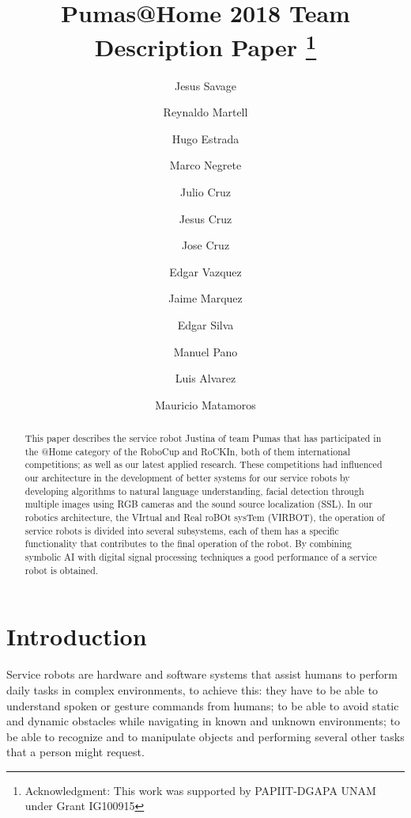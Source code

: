 \documentclass{llncs}
\begin{document}
\title{Pumas@Home 2018 Team Description Paper
\thanks{Acknowledgment: This work was supported by PAPIIT-DGAPA UNAM under Grant IG100915}}
\author{
	Jesus Savage 
	\and Reynaldo Martell 
	\and Hugo Estrada 
	\and Marco Negrete 
	\and Julio Cruz 
	\and Jesus Cruz
	\and Jose Cruz
	\and Edgar Vazquez
	\and Jaime Marquez
	\and Edgar Silva
	\and Manuel Pano 
	\and Luis Alvarez
	\and Mauricio Matamoros
}
\maketitle


\begin{abstract}

This paper describes the service robot Justina of team Pumas that has participated in the @Home category of the RoboCup and RoCKIn, both of them international competitions; as well as our latest applied research. These competitions had influenced our architecture in the development of better systems for our service robots by developing algorithms to natural language understanding, facial detection through multiple images using RGB cameras and the sound source localization (SSL). 
In our robotics architecture, the VIrtual and Real roBOt sysTem (VIRBOT), the operation of service robots is divided into several subsystems, each of them has a specific functionality  that contributes to the final operation of the robot.
By combining symbolic AI with digital signal processing techniques a good performance of a service robot is obtained.

\end{abstract}


\section{Introduction}

Service robots are hardware and software systems that assist humans to perform daily tasks in complex environments, to achieve this: they have to be able to understand spoken or gesture commands from humans; to be able to avoid static and dynamic obstacles while navigating in known and unknown environments; to be able to recognize and to manipulate objects and performing several other tasks that a person might request. 
\end{document}
